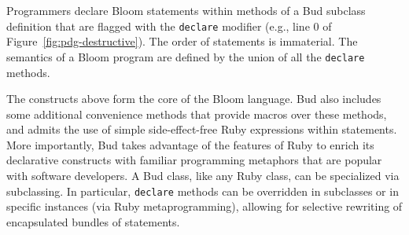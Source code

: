 Programmers declare Bloom statements within methods of a Bud subclass definition that are flagged with the \texttt{declare} modifier (e.g., line 0 of Figure~\ref{fig:pdg-destructive}).  The order of statements is immaterial.  The semantics of a Bloom program are defined by the union of all the \texttt{declare} methods.%

The constructs above form the core of the Bloom language.
Bud also includes some additional convenience methods that provide macros over these methods, and admits the use of simple side-effect-free Ruby expressions within statements.  More importantly, Bud takes advantage of the features of Ruby to enrich its declarative constructs with familiar programming metaphors that are popular with software developers.  A Bud class, like any Ruby class, can be specialized via subclassing.  In particular, \texttt{declare} methods can be overridden in subclasses or in specific instances (via Ruby metaprogramming), allowing for selective rewriting of encapsulated bundles of statements.%

\begin{comment}
Conventional wisdom in certain quarters says that rule-based languages are untenable for large programs that evolve over time, since the interactions among rules become too difficult to understand.  We believe this concern is an artifact of early rule languages that mixed apparently declarative syntax with imperative constructs and assumptions.  In fact, we demonstrate below that the pure logic-programming roots of Bloom can allow programmers to reason about many program interactions in a much deeper way than traditional imperative languages.
\end{comment}


